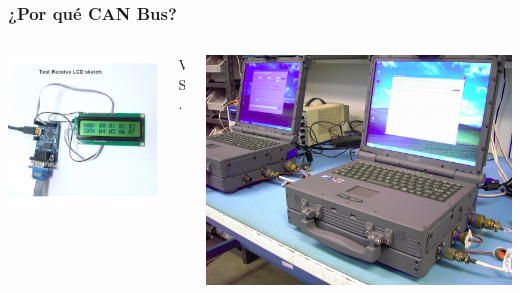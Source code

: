 \begin{frame}
	\frametitle{¿Por qué CAN Bus?}
	\vfill
	\begin{columns}[T]
		\begin{column}{.45\textwidth}
			\centering
			\vspace*{1cm}
			\includegraphics[scale=0.3]{images/bus_can.png}
		\end{column}
	    \begin{column}{.10\textwidth}
			\vspace*{3cm}
	    	\centering
	    	VS.
	    \end{column}
		\begin{column}{.45\textwidth}
			\centering
			\vspace*{2cm}
            \includegraphics[scale=0.1]{images/1553.png}
		\end{column}
	\end{columns}
\end{frame}

